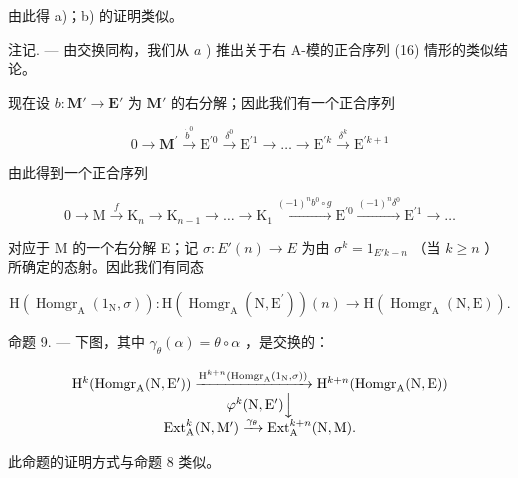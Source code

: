 由此得 a)；b) 的证明类似。

注记. --- 由交换同构，我们从 \(a\) ) 推出关于右 A-模的正合序列 (16) 情形的类似结论。

现在设 \(b: \mathbf{M}' \to \mathbf{E}'\) 为 \(\mathbf{M}'\) 的右分解；因此我们有一个正合序列

\[
0 \rightarrow \mathbf {M} ^ {\prime} \xrightarrow {\dot {b} ^ {0}} \mathrm{E} ^ {\prime 0} \xrightarrow {\delta^ {0}} \mathrm{E} ^ {\prime 1} \rightarrow \dots \rightarrow \mathrm{E} ^ {\prime k} \xrightarrow {\delta^ {k}} \mathrm{E} ^ {\prime k + 1}
\]

由此得到一个正合序列

\[
0 \rightarrow \mathrm{M} \xrightarrow {f} \mathrm{K} _ {n} \rightarrow \mathrm{K} _ {n - 1} \rightarrow \dots \rightarrow \mathrm{K} _ {1} \xrightarrow {(- 1) ^ {n} b ^ {0} \circ g} \mathrm{E} ^ {\prime 0} \xrightarrow {(- 1) ^ {n} \delta^ {0}} \mathrm{E} ^ {\prime 1} \rightarrow \dots
\]

对应于 M 的一个右分解 E；记 \(\sigma : E'(n) \to E\) 为由 \(\sigma^k = 1_{E'k - n}\) （当 \(k \geqslant n\) ）所确定的态射。因此我们有同态

\[
\mathrm{H} \left(\operatorname{Homgr} _ {\mathrm{A}} \left(1 _ {\mathrm{N}}, \sigma\right)\right): \mathrm{H} \left(\operatorname{Homgr} _ {\mathrm{A}} \left(\mathrm{N}, \mathrm{E} ^ {\prime}\right)\right) (n) \rightarrow \mathrm{H} \left(\operatorname{Homgr} _ {\mathrm{A}} (\mathrm{N}, \mathrm{E})\right).
\]

命题 9. --- 下图，其中 \(\gamma_{\theta}(\alpha) = \theta \circ \alpha\) ，是交换的：

\[
\begin{array}{c} \mathrm{H} ^ {k} (\text {Homgr} _ {\mathrm{A}} (\mathrm{N}, \mathrm{E} ^ {\prime})) \xrightarrow {\mathrm{H} ^ {k + n} (\text {Homgr} _ {\mathrm{A}} (1 _ {\mathrm{N}} , \sigma))} \mathrm{H} ^ {k + n} (\text {Homgr} _ {\mathrm{A}} (\mathrm{N}, \mathrm{E})) \\ \varphi^ {k} (\mathrm{N}, \mathrm{E} ^ {\prime}) \Big \downarrow \\ \operatorname{Ext} _ {\mathrm{A}} ^ {k} (\mathrm{N}, \mathrm{M} ^ {\prime}) \xrightarrow {\gamma_ {\theta}} \operatorname{Ext} _ {\mathrm{A}} ^ {k + n} (\mathrm{N}, \mathrm{M}). \end{array}
\]

此命题的证明方式与命题 8 类似。

